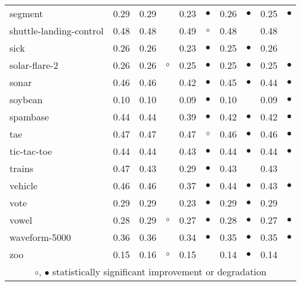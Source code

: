 {\begin{longtable}{lrr@{\hspace{0.1cm}}cr@{\hspace{0.1cm}}cr@{\hspace{0.1cm}}cr@{\hspace{0.1cm}}c}
segment & 0.29 & 0.29 &           & 0.23 & $\bullet$ & 0.26 & $\bullet$ & 0.25 & $\bullet$\\
shuttle-landing-control & 0.48 & 0.48 &           & 0.49 &   $\circ$ & 0.48 &           & 0.48 &          \\
sick & 0.26 & 0.26 &           & 0.23 & $\bullet$ & 0.25 & $\bullet$ & 0.26 &          \\
solar-flare-2 & 0.26 & 0.26 &   $\circ$ & 0.25 & $\bullet$ & 0.25 & $\bullet$ & 0.25 & $\bullet$\\
sonar & 0.46 & 0.46 &           & 0.42 & $\bullet$ & 0.45 & $\bullet$ & 0.44 & $\bullet$\\
soybean & 0.10 & 0.10 &           & 0.09 & $\bullet$ & 0.10 &           & 0.09 & $\bullet$\\
spambase & 0.44 & 0.44 &           & 0.39 & $\bullet$ & 0.42 & $\bullet$ & 0.42 & $\bullet$\\
tae & 0.47 & 0.47 &           & 0.47 &   $\circ$ & 0.46 & $\bullet$ & 0.46 & $\bullet$\\
tic-tac-toe & 0.44 & 0.44 &           & 0.43 & $\bullet$ & 0.44 & $\bullet$ & 0.44 & $\bullet$\\
trains & 0.47 & 0.43 &           & 0.29 & $\bullet$ & 0.43 &           & 0.43 &          \\
vehicle & 0.46 & 0.46 &           & 0.37 & $\bullet$ & 0.44 & $\bullet$ & 0.43 & $\bullet$\\
vote & 0.29 & 0.29 &           & 0.23 & $\bullet$ & 0.29 & $\bullet$ & 0.29 &          \\
vowel & 0.28 & 0.29 &   $\circ$ & 0.27 & $\bullet$ & 0.28 & $\bullet$ & 0.27 & $\bullet$\\
waveform-5000 & 0.36 & 0.36 &           & 0.34 & $\bullet$ & 0.35 & $\bullet$ & 0.35 & $\bullet$\\
zoo & 0.15 & 0.16 &   $\circ$ & 0.15 &           & 0.14 & $\bullet$ & 0.14 &          \\
\hline
\multicolumn{10}{c}{$\circ$, $\bullet$ statistically significant improvement or degradation}\\
\end{longtable} \footnotesize \par}
